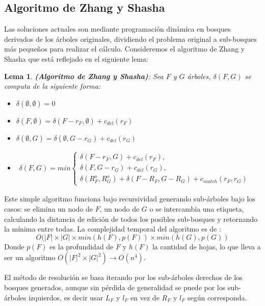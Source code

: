 \documentclass{article}
\newtheorem{lema}{Lema}[section]
\begin{document}
\subsection{Algoritmo de Zhang y Shasha}
Las soluciones actuales son mediante programación dinámica en bosques derivados de los árboles originales, dividiendo el problema original a sub-bosques más pequeños para realizar el cálculo. Consideremos el algoritmo de Zhang y Shasha \cite{TED8} que está reflejado en el siguiente lema:
\begin{lema}
\textbf{(Algoritmo de Zhang y Shasha)}\cite{TED8}: Sea $F$ y $G$ árboles, $\delta(F,G)$ se computa de la siguiente forma:
\begin{itemize}
\item $\delta(\emptyset,\emptyset)=0$
\item $\delta(F,\emptyset)=\delta(F-r_F,\emptyset)+c_{del}(r_F)$
\item $\delta(\emptyset,G)=\delta(\emptyset,G-r_G)+c_{del}(r_G)$
\item 
$\begin{aligned}
\delta(F,G)=min
\begin{cases}
\delta(F-r_F,G)+c_{del}(r_F), \\
\delta(F,G-r_G)+c_{del}(r_G), \\
\delta(R^o_F,R^o_G)+ \delta(F-R_F,G-R_G)+ c_{match}(r_F,r_G)
\end{cases}
\end{aligned}
$
\end{itemize}
\end{lema}
Este simple algoritmo funciona bajo recursividad generando sub-árboles bajo los casos: se elimina un nodo de $F$, un nodo de $G$ o se intercambia una etiqueta, calculando la distancia de edición de todos los posibles sub-bosques y retornando la mínima entre todas.
La complejidad temporal del algoritmo es de \cite{TED8}: 
$$O(|F| \times |G| \times  min(h(F),p(F))\times min(h(G),p(G))$$
Donde $p(F)$ es la profundidad de $F$ y $h(F)$ la cantidad de hojas, lo que lleva a ser un algoritmo $O(|F|^2\times |G|^2) \to O(n^4)$. 

El método de resolución se basa iterando por los sub-árboles derechos de los bosques generados, aunque sin pérdida de generalidad se puede por los sub-árboles izquierdos, es decir usar $L_F$ y $l_F$ en vez de $R_F$ y $l_F$ según corresponda.
\end{document}
